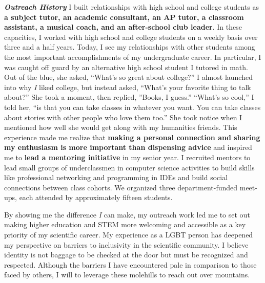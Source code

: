 \textit{\textbf{Outreach History}}
I built relationships with high school and college students as \textbf{a subject tutor, an academic consultant, an AP tutor, a classroom assistant, a musical coach, and an after-school club leader}.
In these capacities, I worked with high school and college students on a weekly basis over three and a half years.
Today, I see my relationships with other students among the most important accomplishments of my undergraduate career.
In particular, I was caught off guard by an alternative high school student I tutored in math.
Out of the blue, she asked, ``What's so great about college?''
I almost launched into why \textit{I} liked college, but instead asked, ``What's your favorite thing to talk about?''
She took a moment, then replied, ''Books, I guess.''
``What's so cool,'' I told her, ``is that you can take classes in whatever you want.
You can take classes about stories with other people who love them too.''
She took notice when I mentioned how well she would get along with my humanities friends.
This experience made me realize that \textbf{making a personal connection and sharing my enthusiasm is more important than dispensing advice} and inspired me to \textbf{lead a mentoring initiative} in my senior year.
I recruited mentors to lead small groups of underclassmen in computer science activities to build skills like professional networking and programming in IDEs and build social connections between class cohorts.
We organized three department-funded meet-ups, each attended by approximately fifteen students.

By showing me the difference \textit{I} can make, my outreach work led me to set out making higher education and STEM more welcoming and accessible as a key priority of my scientific career.
My experience as a LGBT person has deepened my perspective on barriers to inclusivity in the scientific community.
I believe identity is not baggage to be checked at the door but must be recognized and respected.
Although the barriers I have encountered pale in comparison to those faced by others, I will to leverage these molehills to reach out over mountains.

